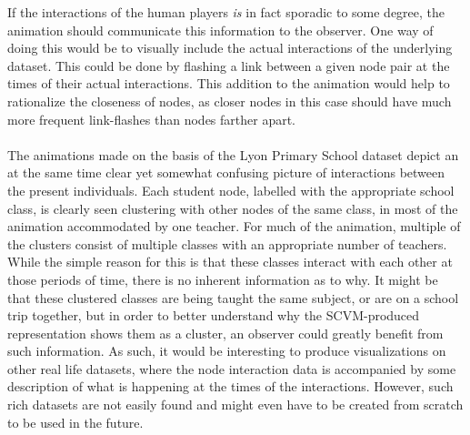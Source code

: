 If the interactions of the human players \textit{is} in fact sporadic to some degree, the animation should communicate this information to the observer.
One way of doing this would be to visually include the actual interactions of the underlying dataset.
This could be done by flashing a link between a given node pair at the times of their actual interactions.
This addition to the animation would help to rationalize the closeness of nodes, as closer nodes in this case should have much more frequent link-flashes than nodes farther apart.
\\\\
The animations made on the basis of the Lyon Primary School dataset depict an at the same time clear yet somewhat confusing picture of interactions between the present individuals.
Each student node, labelled with the appropriate school class, is clearly seen clustering with other nodes of the same class, in most of the animation accommodated by one teacher.
For much of the animation, multiple of the clusters consist of multiple classes with an appropriate number of teachers.
While the simple reason for this is that these classes interact with each other at those periods of time, there is no inherent information as to why.
It might be that these clustered classes are being taught the same subject, or are on a school trip together, but in order to better understand why the SCVM-produced representation shows them as a cluster, an observer could greatly benefit from such information.
As such, it would be interesting to produce visualizations on other real life datasets, where the node interaction data is accompanied by some description of what is happening at the times of the interactions. 
However, such rich datasets are not easily found and might even have to be created from scratch to be used in the future.









